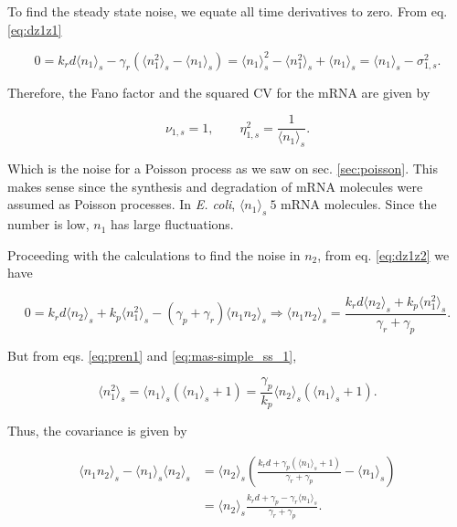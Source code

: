 To find the steady state noise, we equate all time derivatives to zero. From  eq. \eqref{eq:dz1z1}

\begin{equation}
  \label{eq:pren1}
  0 = k_rd \langle n_1 \rangle_s -\gamma_r \left(\langle n_1^2 \rangle_s - \langle n_1 \rangle_s \right) = \langle n_1 \rangle_s^2 - \langle n_1^2 \rangle_s + \langle n_1 \rangle_s = \langle n_1 \rangle_s - \sigma_{1,s}^2.
\end{equation}

Therefore, the Fano factor and the squared CV for the mRNA are given by

\begin{equation}
  \label{noise1}
  \nu_{1,s} = 1, \quad\quad \eta_{1,s}^2 = \frac{1}{\langle n_1 \rangle_s}.
\end{equation}

Which is the noise for a Poisson process as we saw on sec. \ref{sec:poisson}. This makes sense since the synthesis and degradation of mRNA molecules were assumed as Poisson processes. In \textit{E. coli}, $\langle n_1\rangle_s ~ 5$ mRNA molecules. Since the number is low, $n_1$ has large fluctuations.

Proceeding with the calculations to find the noise in $n_2$, from eq. \eqref{eq:dz1z2} we have

\begin{equation*}
  0 = k_rd \langle n_2 \rangle_s + k_p \langle n_1^2 \rangle_s - (\gamma_p + \gamma_r) \langle n_1n_2 \rangle_s \Rightarrow \langle n_1n_2 \rangle_s  = \frac{k_rd\langle n_2\rangle_s+k_p\langle n_1^2\rangle_s}{\gamma_r+\gamma_p}.
\end{equation*}

But from eqs. \eqref{eq:pren1} and \eqref{eq:mas-simple_ss_1},

\begin{equation}
\langle n_1^2 \rangle_s = \langle n_1 \rangle_s\left( \langle n_1 \rangle_s+1\right) = \frac{\gamma_p}{k_p}\langle n_2 \rangle_s\left(\langle n_1\rangle_s + 1\right).
\end{equation}

Thus, the covariance is given by

\begin{align*}
  \langle n_1n_2 \rangle_s - \langle n_1 \rangle_s\langle n_2\rangle_s &= \langle n_2 \rangle_s \left(\frac{k_rd+\gamma_p\left(\langle n_1\rangle_s+1\right)}{\gamma_r+\gamma_p}-\langle n_1\rangle_s\right)\\
  &=\langle n_2\rangle_s\frac{k_rd+\gamma_p-\gamma_r\langle n_1\rangle_s}{\gamma_r+\gamma_p}.
\end{align*}

